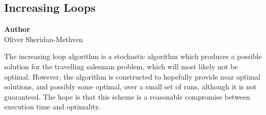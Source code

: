 \subsection{Increasing Loops}
\label{subsec:increasing_loops}

\begin{flushright}
	\textbf{Author} \\
		Oliver Sheridan-Methven
\end{flushright}

The increasing loop algorithm is a stochastic algorithm which produces a possible solution for the travelling salesman problem, which will most likely not be optimal. However, the algorithm is constructed to hopefully provide near optimal solutions, and possibly some optimal, over a small set of runs, although it is not guaranteed. The hope is that this scheme is a reasonable compromise between execution time and optimality.
